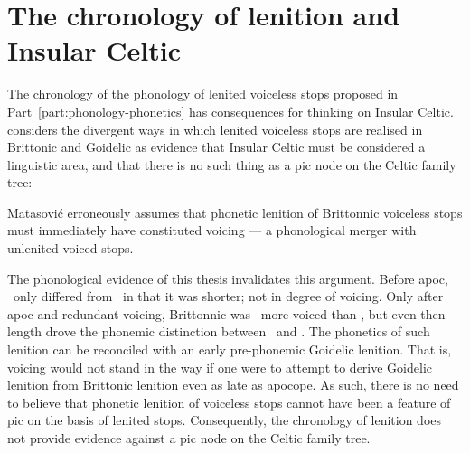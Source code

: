 \section{The chronology of lenition and Insular Celtic}
\label{sec:cons-other-rese-1}
The chronology of the phonology of lenited voiceless stops proposed in Part~\ref{part:phonology-phonetics} has consequences for thinking on Insular Celtic. \Textcite{matasovic_insular_2008} considers the divergent ways in which lenited voiceless stops are realised in Brittonic and Goidelic as evidence that Insular Celtic must be considered  a linguistic area, and that there is no such thing as a \gls{pic} node on the Celtic family tree:

Matasović erroneously assumes that phonetic lenition of Brittonnic  voiceless stops must immediately have constituted voicing --- a phonological merger with unlenited voiced stops.

The phonological evidence of this thesis invalidates this argument. Before \gls{apoc}, \lT\ only differed from \xT\ in that it was shorter; not in degree of voicing. Only after \gls{apoc} and redundant voicing, Brittonnic was \lT\  more voiced than \xT, but even then length drove the phonemic distinction between \xT\ and \lT. The phonetics of such lenition can be reconciled with an early pre-phonemic Goidelic lenition. That is, voicing would not stand in the way if one were to attempt to derive Goidelic lenition from Brittonic lenition even as late as apocope. As such, there is no need to believe  that phonetic lenition of voiceless stops cannot have been a feature of \gls{pic} on the basis of lenited stops. Consequently, the chronology of lenition does not provide evidence against a \gls{pic} node on the Celtic family tree. 


